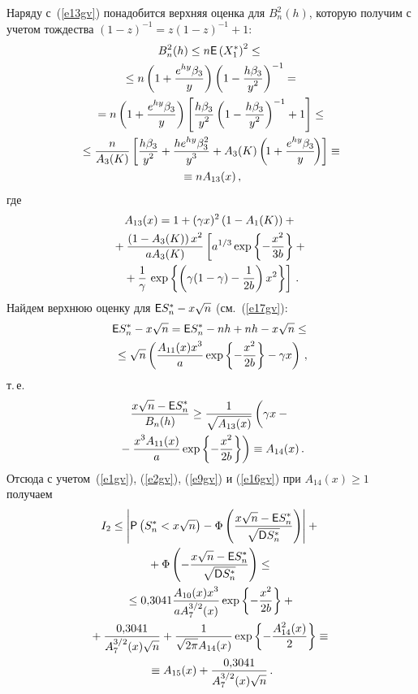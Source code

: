 \begin{multicols}{2}
Наряду с~(\ref{e13gv}) понадобится верхняя оценка для $B_n^2(h)$, которую
получим с учетом тождества $(1-z)^{-1}=z(1-z)^{-1}+1$:
\begin{multline*}
B_n^2(h)\le n{\sf E}\left(X_1^*\right)^2\le{}\\
{}\le
 n\left(1+\fr{e^{hy}\betr}{y}\right)\left(1-\fr{h\betr}{y^{2}}\right)^{-1}={}\\
{} =
n\left(1+\fr{e^{hy}\betr}{y}\right)\left[\fr{h\betr}{y^{2}}\left(1-\fr{h\betr}{y^{2}}\right)^{-1}+1\right]\le{}\\
{}\le
\fr{n}{A_3(K)}\left[\fr{h\betr}{y^{2}}+
\fr{he^{hy}\beta^2_{\dd}}{y^{3}}+A_3(K)\left(\!1+\fr{e^{hy}\betr}{y}\!\right)\right]
\equiv{}\hspace*{-0.7442pt}\\
{}\equiv n A_{13}(x)\,,
\end{multline*}
где
\begin{multline*}
A_{13}(x)=1+(\gamma x)^2\left(1-A_1(K)\right)+{}\\
{}
+\fr{\left(1-A_3(K)\right)x^2}{aA_3(K)}\left[a^{\d/3}\exp\left\{-\fr{x^2}{3b}\right\}+{}\right.\\
\left.{}+\fr{1}{\gamma}\,\exp\left\{\left(\gamma(1-\gamma)-\fr{1}{2b}\right)x^2\right\}\right]\,.
\end{multline*}
Найдем верхнюю оценку для ${\sf E}S_n^*-x\sqrt{n}$ (см.~(\ref{e17gv}):
\begin{multline*}
{\sf E}S_n^*-x\sqrt{n}={\sf
E}S_n^*-nh+nh-x\sqrt{n}\le{}\\
{}\le
\sqrt{n}\left(\fr{A_{11}(x)x^{\dd}}{a}\exp\left\{-\fr{x^2}{2b}\right\}-\gamma
x\right)\,,
\end{multline*}
т.\,е.\
\begin{multline}
\fr{x\sqrt{n}-{\sf E} S_n^*}{B_n(h)}\ge
\fr{1}{\sqrt{A_{13}(x)}}\left(\vphantom{\fr{x^3}{a}}\gamma x-{}\right.\\
\left.{}-\fr{x^{\dd}A_{11}(x)}{a}\exp\left\{-\fr{x^2}{2b}\right\}\right)\equiv
A_{14}(x)\,.\label{e19gv}
\end{multline}
Отсюда с учетом~(\ref{e1gv}), (\ref{e2gv}), (\ref{e9gv}) и (\ref{e16gv}) при
$A_{14}(x)\ge1$ получаем
\begin{multline}
I_2\le\left|{\sf
P}\left(S_n^*<x\sqrt{n}\right)-\Phi\left(\fr{x\sqrt{n}-{\sf
E}S_n^*}{\sqrt{{\sf
D}S_n^*}}\right)\right|+{}\\
{}+\Phi\left(-\fr{x\sqrt{n}-{\sf
E}S_n^*}{\sqrt{{\sf D}S_n^*}}\right)\le{}\\
{}\le 
0{,}3041\fr{A_{10}(x)x^{\dd}}{aA_7^{3/2}(x)}\exp\left\{-\fr{x^2}{2b}\right\}+{}\\
{}+
\fr{0{,}3041}{A_7^{3/2}(x)\sqrt{n}}+
\fr{1}{\sqrt{2\pi}A_{14}(x)}\exp\left\{-\fr{A_{14}^2(x)}{2}\right\}\equiv{}\\
{}
\equiv A_{15}(x)+\fr{0{,}3041}{A_7^{3/2}(x)\sqrt{n}}\,.\label{e20gv}
\end{multline}


\end{multicols}
